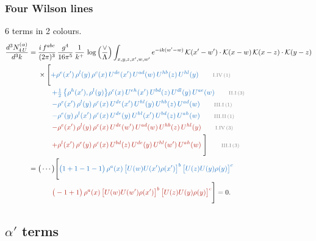 \documentclass[10pt]{article}
\begin{document}
\subsubsection{Four Wilson lines}
6 terms in 2 colours.
\begin{align}
\frac{d^{3}N^{(\alpha)}_{4\,U}}{d^{3}k}={}&\frac{i\,f^{abc}}{(2\pi)^{3}}\,\frac{g^{4}}{16\pi^{5}}\,\frac{1}{k^{+}}\,\log\Big(\frac{\vee}{\Lambda}\Big)\int_{x,y,z,x',w,w'}e^{-ik(w'-w)}\,\mathcal{K}(x'-w')\cdot\mathcal{K}(x-w)\,\mathcal{K}(x-z)\cdot\mathcal{K}(y-z)\notag\\
&\times\Bigg[{\color{RoyalBlue}+\rho^{e}(x')\, \rho^{l}(y)\,\rho^{c}(x)\, U^{de}(x')\,U^{ad}(w)\,U^{hb}(z)\,U^{hl}(y)}\tag*{\color{gray}\scriptsize I.IV\,(1)}\\
&\qquad{\color{RoyalBlue}+\tfrac{1}{2}\,\big\{\rho^{h}(x'),\rho^{l}(y)\big\}\rho^{c}(x)\,U^{eh}(x')\,U^{bd}(z)\,U^{dl}(y)\,U^{ae}(w)}\tag*{\color{gray}\scriptsize II.I\,(3)}\\
&\qquad{\color{RoyalBlue}-\rho^{e}(x')\,\rho^{l}(y)\,\rho^{c}(x)\,U^{de}(x')\,U^{hl}(y)\,U^{hb}(z)\,U^{ad}(w)}\tag*{\color{gray}\scriptsize III.I\,(1)}\\
&\qquad{\color{RoyalBlue}-\rho^{e}(y)\,\rho^{l}(x')\,\rho^{c}(x)\,U^{de}(y)\,U^{hl}(x')\,U^{bd}(z)\,U^{ah}(w)}\tag*{\color{gray}\scriptsize III.II\,(1)}\\
&\qquad{\color{BrickRed}-\rho^{e}(x')\, \rho^{l}(y)\,\rho^{c}(x)\, U^{de}(w')\,U^{ad}(w)\,U^{hb}(z)\,U^{hl}(y)}\tag*{\color{gray}\scriptsize I.IV\,(3)}\\
&\qquad{\color{BrickRed}+\rho^{l}(x')\,\rho^{e}(y)\,\rho^{c}(x)\,U^{bd}(z)\,U^{de}(y)\,U^{hl}(w')\,U^{ah}(w)}\;\Bigg]\tag*{\color{gray}\scriptsize III.I\,(3)}\\
={}&\big(\cdots\big)\Bigg[{\color{RoyalBlue}\big(1+1-1-1\big)\,\rho^{a}(x)\,\big[U(w)U(x')\rho(x')\big]^{b}\,\big[U(z)U(y)\rho(y)\big]^{c}}\notag\\
&\qquad{\color{BrickRed}\big(-1+1\big)\,\rho^{a}(x)\,\big[U(w)U(w')\rho(x')\big]^{b}\,\big[U(z)U(y)\rho(y)\big]^{c}}\Bigg]=0.
\end{align}
\subsection{$\alpha'$ terms}
\end{document}
